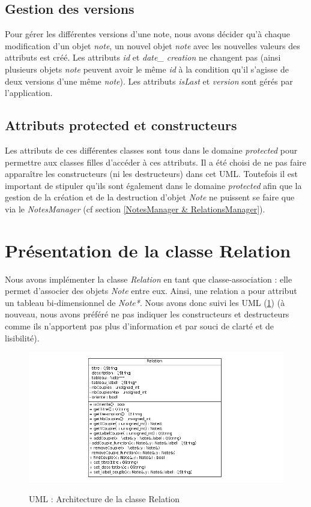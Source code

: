 \documentclass[a4paper,10pt]{report}
\begin{document}
\subsection{Gestion des versions}
Pour gérer les différentes versions d'une note, nous avons décider qu'à chaque modification d'un objet \textit{note}, un nouvel objet \textit{note} avec les nouvelles valeurs des attributs est créé. Les attributs \textit{id} et \textit{date\_ creation} ne changent pas (ainsi plusieurs objets \textit{note} peuvent avoir le même \textit{id} à la condition qu'il s'agisse de deux versions d'une même \textit{note}). Les attributs \textit{isLast} et \textit{version} sont gérés par l'application.

\subsection{Attributs protected et constructeurs}
Les attributs de ces différentes classes sont tous dans le domaine \textit{protected} pour permettre aux classes filles d'accéder à ces attributs. Il a été choisi de ne pas faire apparaître les constructeurs (ni les destructeurs) dans cet UML. Toutefois il est important de stipuler qu'ils sont également dans le domaine \textit{protected} afin que la gestion de la création et de la destruction d'objet \textit{Note} ne puissent se faire que via le \textit{NotesManager} (cf section \ref{NotesManager & RelationsManager}).

\section{Présentation de la classe Relation}
Nous avons implémenter la classe \textit{Relation} en tant que classe-association : elle permet d'associer des objets \textit{Note} entre eux. Ainsi, une relation a pour attribut un tableau bi-dimensionnel de \textit{Note*}. Nous avons donc suivi les UML (\ref{UML_relation}) (à nouveau, nous avons préféré ne pas indiquer les constructeurs et destructeurs comme ils n'apportent pas plus d'information et par souci de clarté et de lisibilité).
\begin{center}
\begin{figure}[H]
\caption{UML : Architecture de la classe Relation}
\includegraphics[width=\textwidth]{UML_relation.png}
\label{UML_relation}
\end{figure}
\end{center}
\end{document}
